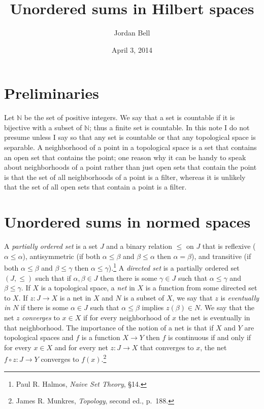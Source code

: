 \documentclass{article}
\begin{document}
\title{Unordered sums in Hilbert spaces}
\author{Jordan Bell}
\date{April 3, 2014}

\maketitle

\section{Preliminaries}
Let $\mathbb{N}$ be the set of positive integers. We say that a set is countable if it is bijective with a subset of
$\mathbb{N}$; thus a finite set is countable. 
In this note I do not presume unless I say so that any set is countable or that any topological space is separable. A neighborhood of a point in a topological space is a set that contains an open set that
contains the point; one reason why it can be handy to speak about neighborhoods of a point rather than just open sets that contain the point is that
the set of all neighborhoods of a point is a filter, whereas it is unlikely that the set of all open sets that contain a point is a filter.


\section{Unordered sums in normed spaces}
A {\em partially ordered set} is a set $J$ and a binary relation $\leq$ on $J$ that is reflexive ($\alpha \leq \alpha$),
antisymmetric (if both $\alpha \leq \beta$ and $\beta \leq \alpha$ then $\alpha=\beta$), and 
transitive (if both $\alpha \leq \beta$ and $\beta \leq \gamma$ then $\alpha \leq \gamma$).\footnote{Paul R. Halmos, {\em Naive Set Theory}, \S 14.}
A {\em directed set} is a partially ordered set $(J,\leq)$ such that if $\alpha,\beta \in J$ then there is some $\gamma \in J$ such that
$\alpha \leq \gamma$ and $\beta \leq \gamma$.
If $X$ is a topological space, a {\em net} in $X$ is a function from some directed set to $X$. If
$z:J \to X$ is a net in $X$ and $N$ is a subset of $X$, we say that $z$ is {\em eventually in $N$}
if there is some $\alpha \in J$ such that  $\alpha \leq \beta$ implies $z(\beta) \in N$. We say that the net $z$ {\em converges}
to $x \in X$ if for every neighborhood of $x$ the net is eventually in that neighborhood. The importance of the notion
of a net is that if $X$ and $Y$ are topological spaces and $f$ is a function $X \to Y$ then $f$ is continuous if and only if for every $x \in X$ and for every
net $z:J \to X$ that converges to $x$, the net $f \circ z:J \to Y$ converges to $f(x)$.\footnote{James R. Munkres,
{\em Topology}, second ed., p.~188.}
\end{document}
